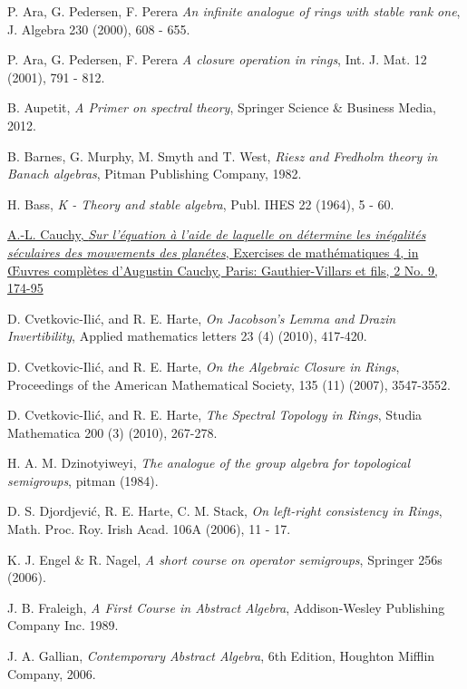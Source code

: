 \documentclass[12pt, oneside]{book}
\begin{document}
\begin{thebibliography}{99}

 P. Ara, G. Pedersen, F. Perera \textit{An infinite analogue of rings with 
stable rank one}, J. Algebra 230 (2000), 608 - 655.

 P. Ara, G. Pedersen, F. Perera \textit{A closure operation in rings}, Int. J. 
Mat. 12 (2001), 791 - 812.


 B. Aupetit, \textit{A Primer on spectral theory}, Springer Science \& Business 
Media, 2012.

 B. Barnes, G. Murphy, M. Smyth and T. West, \textit{Riesz and Fredholm theory in 
Banach algebras}, Pitman Publishing Company, 1982. 

 H. Bass, \textit{K - Theory and stable algebra}, Publ. IHES 22 (1964), 5 - 60.

 \href{https://gallica.bnf.fr/ark:/12148/bpt6k90201q/f177}{A.-L. Cauchy, \textit{Sur l'équation à l'aide de laquelle on détermine les inégalités séculaires des mouvements des planétes}, Exercises de mathématiques 4, in Œuvres complètes d'Augustin Cauchy, Paris: Gauthier-Villars et fils, 2 No. 9, 174-95}

 D. Cvetkovic-Ili\'{c}, and R. E. Harte, \textit{On Jacobson’s Lemma and Drazin Invertibility}, Applied mathematics letters 23 (4) (2010), 417-420.

 D. Cvetkovic-Ili\'{c}, and R. E. Harte, \textit{On the Algebraic Closure in Rings}, Proceedings of the American Mathematical Society, 135 (11) (2007), 3547-3552.

 D. Cvetkovic-Ili\'{c}, and R. E. Harte, \textit{The Spectral Topology in Rings}, Studia Mathematica 200 (3) (2010), 267-278.

 H. A. M. Dzinotyiweyi, \textit{The analogue of the group algebra for topological semigroups}, pitman (1984).

 D. S. Djordjevi\'{c}, R. E. Harte, C. M. Stack, \textit{On left-right consistency in Rings}, Math. Proc. Roy. Irish Acad. 106A (2006), 11 - 17.

 K. J. Engel \& R. Nagel, \textit{A short course on operator semigroups}, Springer 256s (2006).

 J. B. Fraleigh, \textit{A First Course in Abstract Algebra}, Addison-Wesley Publishing Company Inc. 1989.

 J. A. Gallian, \textit{Contemporary Abstract Algebra}, 6th Edition, Houghton Mifflin Company, 2006.


\end{thebibliography}
\end{document}
